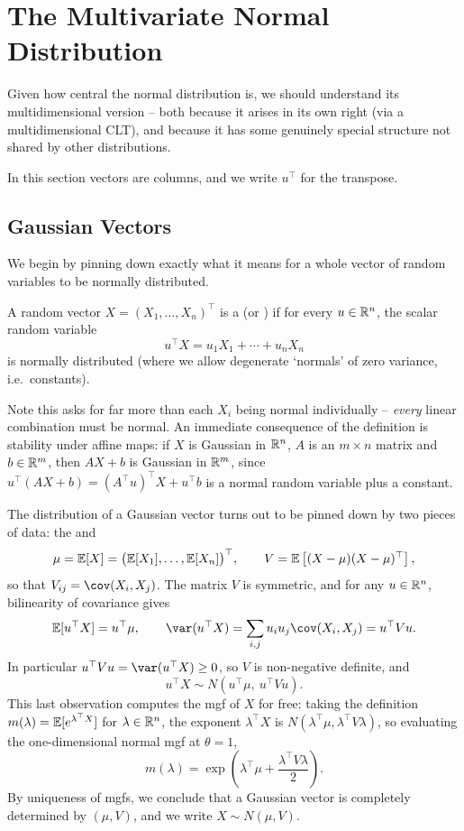 \documentclass[a4paper]{scrartcl}
\begin{document}
\section{The Multivariate Normal Distribution}

Given how central the normal distribution is, we should understand its multidimensional version -- both because it arises in its own right (via a multidimensional CLT), and because it has some genuinely special structure not shared by other distributions.

In this section vectors are columns, and we write $u^\top$ for the transpose.

\subsection{Gaussian Vectors}

We begin by pinning down exactly what it means for a whole vector of random variables to be normally distributed.

\begin{definition}
	A random vector $X = (X_1, \dots, X_n)^\top$ is a  (or ) if for every $u \in \mathbb{R}^n$, the scalar random variable
	$$
	u^\top X = u_1 X_1 + \cdots + u_n X_n
	$$
	is normally distributed (where we allow degenerate `normals' of zero variance, i.e.\ constants).
\end{definition}

Note this asks for far more than each $X_i$ being normal individually -- \emph{every} linear combination must be normal. An immediate consequence of the definition is stability under affine maps: if $X$ is Gaussian in $\mathbb{R}^n$, $A$ is an $m \times n$ matrix and $b \in \mathbb{R}^m$, then $AX + b$ is Gaussian in $\mathbb{R}^m$, since $u^\top(AX + b) = (A^\top u)^\top X + u^\top b$ is a normal random variable plus a constant.

The distribution of a Gaussian vector turns out to be pinned down by two pieces of data: the  and 
$$
\mu = \mathbb{E}[X] = \big(\mathbb{E}[X_1], \dots, \mathbb{E}[X_n]\big)^\top, \qquad V = \mathbb{E}\left[(X - \mu)(X - \mu)^\top\right],
$$
so that $V_{ij} = \cov(X_i, X_j)$. The matrix $V$ is symmetric, and for any $u \in \mathbb{R}^n$, bilinearity of covariance gives
$$
\EE[u^\top X] = u^\top \mu, \qquad \var(u^\top X) = \sum_{i, j} u_i u_j \cov(X_i, X_j) = u^\top V u.
$$
In particular $u^\top V u = \var(u^\top X) \geq 0$, so $V$ is non-negative definite, and
$$
u^\top X \sim N(u^\top \mu,\ u^\top V u).
$$
This last observation computes the mgf of $X$ for free: taking the definition $m(\lambda) = \mathbb{E}[e^{\lambda^\top X}]$ for $\lambda \in \mathbb{R}^n$, the exponent $\lambda^\top X$ is $N(\lambda^\top\mu, \lambda^\top V \lambda)$, so evaluating the one-dimensional normal mgf at $\theta = 1$,
$$
m(\lambda) = \exp\left(\lambda^\top \mu + \frac{\lambda^\top V \lambda}{2}\right).
$$
By uniqueness of mgfs, we conclude that a Gaussian vector is completely determined by $(\mu, V)$, and we write $X \sim N(\mu, V)$.
\end{document}
